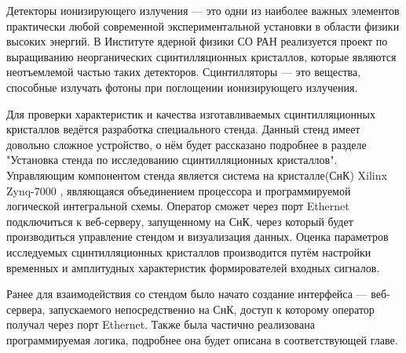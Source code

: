 Детекторы ионизирующего излучения --- это одни из наиболее важных элементов практически любой современной экспериментальной установки в области физики высоких энергий. В Институте ядерной физики СО РАН реализуется проект по выращиванию неорганических сцинтилляционных кристаллов, которые являются неотъемлемой частью таких детекторов. Сцинтилляторы --- это вещества, способные излучать фотоны при поглощении ионизирующего излучения.\par
Для проверки характеристик и качества изготавливаемых сцинтилляционных кристаллов ведётся разработка специального стенда. Данный стенд имеет довольно сложное устройство, о нём будет рассказано подробнее в разделе "Установка стенда по исследованию сцинтилляционных кристаллов". Управляющим компонентом стенда является система на кристалле(СнК) Xilinx Zynq-7000 \parencite{XilinxZYNQ7000}, являющаяся объединением процессора и программируемой логической интегральной схемы. Оператор сможет через порт Ethernet подключиться к веб-серверу, запущенному на СнК, через который будет производиться управление стендом и визуализация данных. Оценка параметров исследуемых сцинтилляционных кристаллов производится путём настройки временных и амплитудных характеристик формирователей входных сигналов.\par
Ранее для взаимодействия со стендом было начато создание интерфейса --- веб-сервера, запускаемого непосредственно на СнК, доступ к которому оператор получал через порт Ethernet. Также была частично реализована программируемая логика, подробнее она будет описана в соответствующей главе.\par
